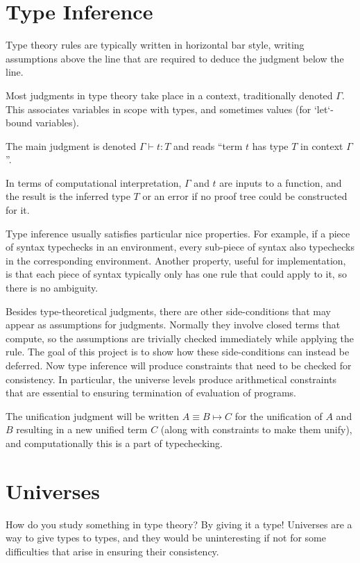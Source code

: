 \documentclass[11pt, twoside, reqno]{book}
\begin{document}
\chapter{Type Inference}
\label{type-inf}

Type theory rules are typically written in horizontal bar style, writing assumptions above the line that are required to deduce the judgment below the line.

Most judgments in type theory take place in a context, traditionally denoted \(\Gamma\).
This associates variables in scope with types, and sometimes values (for \inHS`let`-bound variables).

The main judgment is denoted \(\Gamma \vdash t : T\) and reads ``term \(t\) has type \(T\) in context \(\Gamma\)''.

In terms of computational interpretation, \(\Gamma\) and \(t\) are inputs to a function, and the result is the inferred type \(T\) or an error if no proof tree could be constructed for it.

Type inference usually satisfies particular nice properties.
For example, if a piece of syntax typechecks in an environment, every sub-piece of syntax also typechecks in the corresponding environment.
Another property, useful for implementation, is that each piece of syntax typically only has one rule that could apply to it, so there is no ambiguity.

Besides type-theoretical judgments, there are other side-conditions that may appear as assumptions for judgments.
Normally they involve closed terms that compute, so the assumptions are trivially checked immediately while applying the rule.
The goal of this project is to show how these side-conditions can instead be deferred.
Now type inference will produce constraints that need to be checked for consistency.
In particular, the universe levels produce arithmetical constraints that are essential to ensuring termination of evaluation of programs.

The unification judgment will be written \(A \equiv B \mapsto C\) for the unification of \(A\) and \(B\) resulting in a new unified term \(C\) (along with constraints to make them unify), and computationally this is a part of typechecking.

\chapter{Universes}
\label{universes}

How do you study something in type theory?
By giving it a type!
Universes are a way to give types to types, and they would be uninteresting if not for some difficulties that arise in ensuring their consistency.
\end{document}
